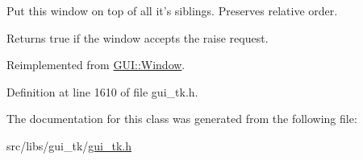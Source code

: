 Put this window on top of all it's siblings. Preserves relative order. 

Returns true if the window accepts the raise request. 

Reimplemented from \hyperlink{classGUI_1_1Window_a90890951f6ce5f043657756b2691e754}{G\-U\-I\-::\-Window}.



Definition at line 1610 of file gui\-\_\-tk.\-h.



The documentation for this class was generated from the following file\-:\begin{DoxyCompactItemize}
\item 
src/libs/gui\-\_\-tk/\hyperlink{gui__tk_8h}{gui\-\_\-tk.\-h}\end{DoxyCompactItemize}
